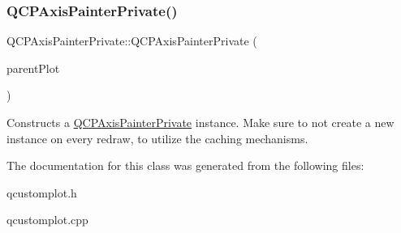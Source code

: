 \subsubsection{\texorpdfstring{Q\+C\+P\+Axis\+Painter\+Private()}{QCPAxisPainterPrivate()}}
{\footnotesize\ttfamily Q\+C\+P\+Axis\+Painter\+Private\+::\+Q\+C\+P\+Axis\+Painter\+Private (\begin{DoxyParamCaption}\item[{\hyperlink{class_q_custom_plot}{Q\+Custom\+Plot} $\ast$}]{parent\+Plot }\end{DoxyParamCaption})\hspace{0.3cm}{\ttfamily [explicit]}}

Constructs a \hyperlink{class_q_c_p_axis_painter_private}{Q\+C\+P\+Axis\+Painter\+Private} instance. Make sure to not create a new instance on every redraw, to utilize the caching mechanisms. 

The documentation for this class was generated from the following files\+:\begin{DoxyCompactItemize}
\item 
qcustomplot.\+h\item 
qcustomplot.\+cpp\end{DoxyCompactItemize}
